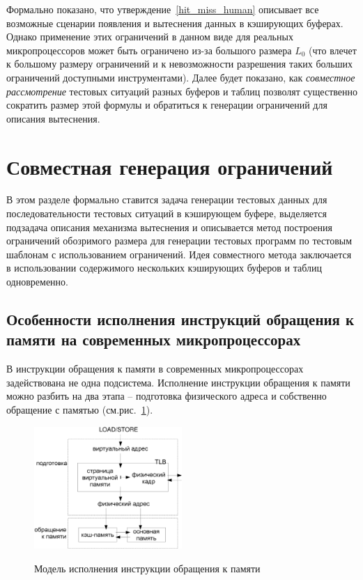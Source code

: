 Формально показано, что утверждение~\ref{hit_miss_human} описывает
все возможные сценарии появления и вытеснения данных в кэширующих
буферах. Однако применение этих ограничений в данном виде для
реальных микропроцессоров может быть ограничено из-за большого
размера $L_0$ (что влечет к большому размеру ограничений и к
невозможности разрешения таких больших ограничений доступными
инструментами). Далее будет показано, как \emph{совместное
рассмотрение} тестовых ситуаций разных буферов и таблиц позволят
существенно сократить размер этой формулы и обратиться к генерации
ограничений для описания вытеснения.

\section{Совместная генерация ограничений}

В этом разделе формально ставится задача генерации тестовых данных
для последовательности тестовых ситуаций в кэширующем буфере,
выделяется подзадача описания механизма вытеснения и описывается
метод построения ограничений обозримого размера для генерации
тестовых программ по тестовым шаблонам с использованием ограничений.
Идея совместного метода заключается в использовании содержимого
нескольких кэширующих буферов и таблиц одновременно.



\subsection{Особенности исполнения инструкций обращения к памяти
на современных микропроцессорах}

В инструкции обращения к памяти в современных микропроцессорах
задействована не одна подсистема. Исполнение инструкции обращения к
памяти можно разбить на два этапа -- подготовка физического адреса и
собственно обращение с памятью (см.рис.~\ref{memoryAccess}).

\begin{figure}[h] \center
  \includegraphics[width=0.5\textwidth]{2.theor/instr}\\
  \caption{Модель исполнения инструкции обращения к памяти}\label{memoryAccess}
\end{figure}

